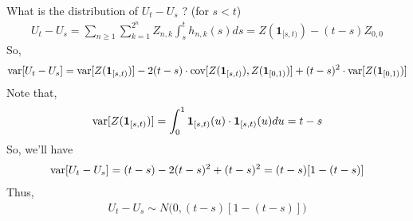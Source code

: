 \documentclass[../../../Master/AppliedStochastics.tex]{subfiles}
\begin{document}
What is the distribution of $U_{t}-U_{s}$ ? (for $s<t$)
$$\begin{aligned}
U_{t}-U_{s} = \sum_{n\geq1}\sum_{k=1}^{2^n} Z_{n,k}\int_{s}^{t} h_{n,k}(s)ds = Z(\mathbf{1}_{[s,t)})-(t-s)Z_{0,0}
\end{aligned}$$
So, 
$$\begin{aligned}
\operatorname{var}[U_{t}-U_{s}] = \operatorname{var}[Z(\mathbf{1}_{[s,t)})]- 2(t-s)\cdot\operatorname{cov}[Z(\mathbf{1}_{[s,t)}),Z(\mathbf{1}_{[0,1)})] + (t-s)^2 \cdot \operatorname{var}[Z(\mathbf{1}_{[0,1)})]
\end{aligned}$$
Note that, 
$$\begin{aligned}
\operatorname{var}[Z(\mathbf{1}_{[s,t)})] = \int_{0}^{1} \mathbf{1}_{[s,t)}(u) \cdot \mathbf{1}_{[s,t)}(u) du = t-s 
\end{aligned}$$
So, we'll have 
$$\begin{aligned}
\operatorname{var}[U_{t}-U_{s}] = (t-s) - 2(t-s)^2 + (t-s)^2 = (t-s)[1-(t-s)]
\end{aligned}$$
Thus, 
$$\begin{aligned}
U_{t}-U_{s} \sim N\Big(0, (t-s)[1-(t-s)]\Big)
\end{aligned}$$











%
\end{document}
